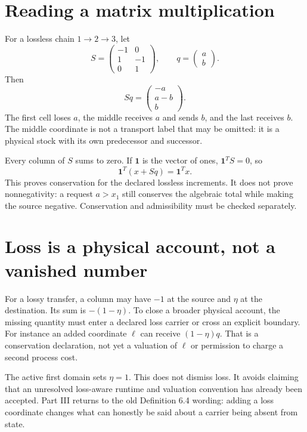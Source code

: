 \section{Reading a matrix multiplication}
For a lossless chain $1\to2\to3$, let
\begin{equation}
 S=\begin{pmatrix}-1&0\\1&-1\\0&1\end{pmatrix},
 \qquad q=\begin{pmatrix}a\\b\end{pmatrix}.
\end{equation}
Then
\begin{equation}
 Sq=\begin{pmatrix}-a\\a-b\\b\end{pmatrix}.
\end{equation}
The first cell loses $a$, the middle receives $a$ and sends $b$, and the
last receives $b$. The middle coordinate is not a transport label that may
be omitted: it is a physical stock with its own predecessor and successor.

Every column of $S$ sums to zero. If $\mathbf1$ is the vector of ones,
$\mathbf1^T S=0$, so
\begin{equation}
 \mathbf1^T(x+Sq)=\mathbf1^Tx.
\end{equation}
This proves conservation for the declared lossless increments. It does not
prove nonnegativity: a request $a>x_1$ still conserves the algebraic total
while making the source negative. Conservation and admissibility must be
checked separately.

\section{Loss is a physical account, not a vanished number}
For a lossy transfer, a column may have $-1$ at the source and $\eta$ at the
destination. Its sum is $-(1-\eta)$. To close a broader physical account,
the missing quantity must enter a declared loss carrier or cross an explicit
boundary. For instance an added coordinate $\ell$ can receive
$(1-\eta)q$. That is a conservation declaration, not yet a valuation of
$\ell$ or permission to charge a second process cost.

The active first domain sets $\eta=1$. This does not dismiss loss. It avoids
claiming that an unresolved loss-aware runtime and valuation convention has
already been accepted. Part III returns to the old Definition 6.4 wording:
adding a loss coordinate changes what can honestly be said about a carrier
being absent from state.

